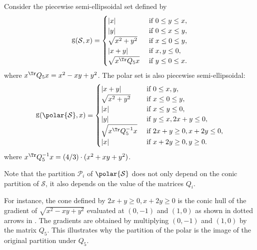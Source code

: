 \documentclass[11pt,twoside,a4paper,openright]{uclouvain-thesis}
\newcommand{\implementations}[1]{}
\DeclareMathOperator{\gauge}{g}
\begin{document}
\begin{myexem}
  \label{exem:piecequad}
  Consider the piecewise semi-ellipsoidal set defined by
  \begin{equation}
    \label{eq:pieceprimal}
    \gauge(\mathcal{S}, x) =
    \begin{cases}
      |x| & \text{ if } 0 \le y \le x,\\
      |y| & \text{ if } 0 \le x \le y,\\
      \sqrt{x^2 + y^2} & \text{ if } x \le 0 \le y,\\
      |x + y| & \text{ if } x, y \le 0,\\
      \sqrt{x^\Tr Q_5 x} & \text{ if } y \le 0 \le x.
    \end{cases}
  \end{equation}
  where $x^\Tr Q_5 x = x^2 - xy + y^2$.
  The polar set is also piecewise semi-ellipsoidal:
  \begin{equation}
    \label{eq:piecepolar}
    \gauge(\polar{\mathcal{S}}, x) =
    \begin{cases}
      |x + y| & \text{ if } 0 \le x, y,\\
      \sqrt{x^2 + y^2} & \text{ if } x \le 0 \le y,\\
      |x| & \text{ if } x \le y \le 0,\\
      |y| & \text{ if } y \le x, 2x + y \le 0,\\
      \sqrt{x^\Tr Q_5^{-1} x} & \text{ if } 2x + y \ge 0, x + 2y \le 0,\\
      |x| & \text{ if } x + 2y \ge 0, y \ge 0.
    \end{cases}
  \end{equation}
  where $x^\Tr Q_5^{-1} x = (4/3) \cdot (x^2 + xy + y^2)$.

  Note that the partition $\mathcal{P}_i$ of $\polar{\mathcal{S}}$ does
  not only depend on the conic partition of $\mathcal{S}$, it also depends on the
  value of the matrices $Q_i$.

  For instance, the cone defined by $2x + y \ge 0, x + 2y \ge 0$
  is the conic hull of the gradient of $\sqrt{x^2 - xy + y^2}$ evaluated
  at $(0, -1)$ and $(1, 0)$ as shown in dotted arrows in .
  The gradients are obtained by multiplying $(0, -1)$ and $(1, 0)$
  by the matrix $Q_5$.
  This illustrates why the partition of the polar is the image of
  the original partition under $Q_5$.
\end{myexem}



\implementations{\jlpkg{SetProg}.}
\end{document}
